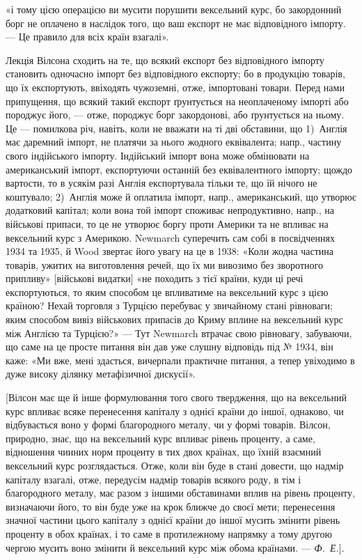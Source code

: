 \parcont{}  %
«і тому цією операцією ви мусити порушити вексельний курс, бо закордонний
борг не оплачено в наслідок того, що ваш експорт не має відповідного імпорту.
— Це правило для всіх країн взагалі».

Лекція Вілсона сходить на те, що всякий експорт без відповідного імпорту
становить одночасно імпорт без відповідного експорту; бо в продукцію товарів,
що їх експортують, ввіходять чужоземні, отже, імпортовані товари. Перед
нами припущення, що всякий такий експорт ґрунтується на неоплаченому
імпорті або породжує його, — отже, породжує борг закордонові, або ґрунтується
на ньому. Це — помилкова річ, навіть, коли не вважати на ті дві обставини,
що 1)~Англія має даремний імпорт, не платячи за нього жодного еквівалента;
напр., частину свого індійського імпорту. Індійський імпорт вона може обмінювати
на американський імпорт, експортуючи останній без еквівалентного імпорту;
щождо вартости, то в усякім разі Англія експортувала тільки те, що їй нічого
не коштувало; 2)~Англія може й оплатила імпорт, напр., американський, що
утворює додатковий капітал; коли вона той імпорт споживає непродуктивно,
напр., на військові припаси, то це не утворює боргу проти Америки та не
впливає на вексельний курс з Америкою. Newmarch суперечить сам собі в
посвідченнях 1934 та 1935, й Wood звертає його увагу на це в 1938: «Коли
жодна частина товарів, ужитих на виготовлення речей, що їх ми вивозимо без
зворотного припливу» [військові видатки] «не походить з тієї країни, куди ці
речі експортуються, то яким способом це впливатиме на вексельний курс з цією
країною? Нехай торговля з Турцією перебуває у звичайному стані рівноваги;
яким способом вивіз військових припасів до Криму вплине на вексельний курс
між Англією та Турцією?» — Тут Newmarch втрачає свою рівновагу, забуваючи,
що саме на це просте питання він дав уже слушну відповідь під № 1934, він
каже: «Ми вже, мені здасться, вичерпали практичне питання, а тепер увіходимо
в дуже високу ділянку метафізичної дискусії».

[Вілсон має ще й інше формулювання того свого твердження, що на вексельний
курс впливає всяке перенесення капіталу з однієї країни до іншої, однаково,
чи відбувається воно у формі благородного металу, чи у формі товарів.
Вілсон, природно, знає, що на вексельний курс впливає рівень проценту, а
саме, відношення чинних норм проценту в тих двох країнах, що їхній взаємний
вексельний курс розглядається. Отже, коли він буде в стані довести, що надмір
капіталу взагалі, отже, передусім надмір товарів всякого роду, в тім і благородного
металу, має разом з іншими обставинами вплив на рівень проценту, визначаючи
його, то він буде уже на крок ближче до своєї мети; перенесення
значної частини цього капіталу з однієї країни до іншої мусить змінити рівень
проценту в обох країнах, і то саме в протилежному напрямку а тому другою
чергою мусить воно змінити й вексельний курс між обома країнами. — \emph{Ф.~Е.}].


